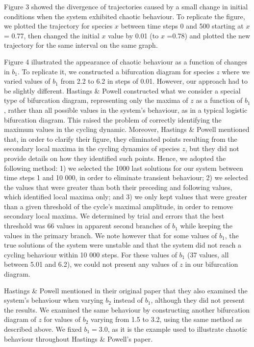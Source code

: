 Figure 3 showed the divergence of trajectories caused by a small change in initial
conditions when the system exhibited chaotic behaviour.
To replicate the figure, we plotted the trajectory for species $x$ between time steps 0
and 500 starting at $x$ = 0.77, then changed the initial $x$ value by 0.01 (to $x$ =0.78)
and plotted the new trajectory for the same interval on the same graph.

Figure 4 illustrated the appearance of chaotic behaviour as a function of changes in
$b_1$. To replicate it, we constructed a bifurcation diagram for species $z$ where we
varied values of $b_1$ from 2.2 to 6.2 in steps of 0.01. However, our approach had to be
slightly different.
Hastings & Powell constructed what we consider a special type of bifurcation diagram,
representing only the maxima of $z$ as a function of $b_1$, rather than all possible
values in the system's behaviour, as in a typical logistic bifurcation diagram.
This raised the problem of correctly identifying the maximum values in the cycling
dynamic. Moreover, Hastings & Powell mentioned that, in order to clarify their figure,
they eliminated points resulting from the secondary local maxima in the cycling dynamics
of species $z$, but they did not provide details on how they identified such points.
Hence, we adopted the following method:
1) we selected the 1000 last solutions for our system between time steps 1 and 10 000, in
order to eliminate transient behaviour;
2) we selected the values that were greater than both their preceding and following
values, which identified local maxima only;
and 3) we only kept values that were greater than a given threshold of the cycle's maximal
amplitude, in order to remove secondary local maxima.
We determined by trial and errors that the best threshold was 66%
values in apparent second branches of $b_1$ while keeping the values in the primary
branch. We note however that for some values of $b_1$, the true solutions of the system
were unstable and that the system did not reach a cycling behaviour within 10 000 steps.
For these values of $b_1$ (37 values, all between 5.01 and 6.2), we could not present any
values of $z$ in our bifurcation diagram.

Hastings & Powell mentioned in their original paper that they also examined the system's
behaviour when varying $b_2$ instead of $b_1$, although they did not present the results.
We examined the same behaviour by constructing another bifurcation diagram of $z$ for
values of $b_2$ varying from 1.5 to 3.2, using the same method as described above.
We fixed $b_1 = 3.0$, as it is the example used to illustrate chaotic behaviour throughout
Hastings & Powell's paper.

